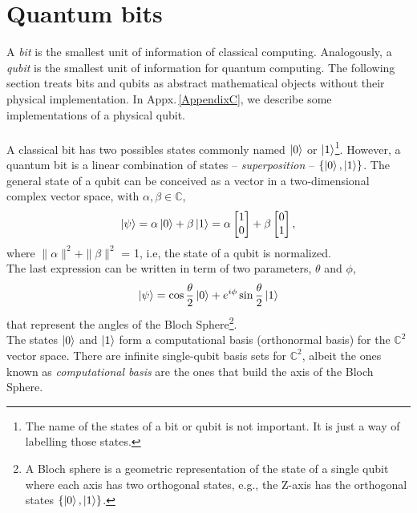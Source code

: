 \section{Quantum bits}
A \textit{bit} is the smallest unit of information of classical computing. Analogously, a \textit{qubit} is the smallest unit of information for quantum computing. The following section treats bits and qubits as abstract mathematical objects without their physical implementation. In Appx.\,\ref{AppendixC}, we describe some implementations of a physical qubit.\\\\
A classical bit has two possibles states commonly named $\ket{0}$ or $\ket{1}$\footnote{The name of the states of a bit or qubit is not important. It is just a way of labelling those states.}. However, a quantum bit is a linear combination of states -- \textit{superposition} -- $\{\ket{0}, \ket{1}\}$. The general state of a qubit can be conceived as a vector in a two-dimensional complex vector space, with $\alpha, \beta \in \mathbb{C}$,
\begin{equation}
    \ket{\psi} = \alpha \ket{0} + \beta \ket{1} = \alpha \begin{bmatrix}
           1 \\
           0 
         \end{bmatrix}
         +
         \beta
         \begin{bmatrix}
           0 \\
           1 
         \end{bmatrix},
\end{equation}
where $\|\alpha\|^{2} + \|\beta\|^{2}$ = 1, i.e, the state of a qubit is normalized.\\
The last expression can be written in term of two parameters, $\theta$ and $\phi$,
\begin{equation}
    \ket{\psi} = \cos{\frac{\theta}{2}}\ket{0} + e^{i\phi}\sin{\frac{\theta}{2}}\ket{1}
\end{equation}
that represent the angles of the Bloch Sphere\footnote{A Bloch sphere is a geometric representation of the state of a single qubit where each axis has two orthogonal states, e.g., the Z-axis has the orthogonal states $\{\ket{0},\ket{1}\}$.}.\\
The states $\ket{0}$ and $\ket{1}$ form a computational basis (orthonormal basis) for the $\mathbb{C}^{2}$ vector space. There are infinite single-qubit basis sets for $\mathbb{C}^{2}$, albeit the ones known as \textit{computational basis} are the ones that build the axis of the Bloch Sphere.

